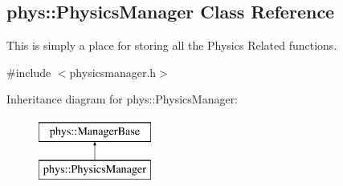 \hypertarget{classphys_1_1PhysicsManager}{
\subsection{phys::PhysicsManager Class Reference}
\label{d3/dcc/classphys_1_1PhysicsManager}
}


This is simply a place for storing all the Physics Related functions.  




{\ttfamily \#include $<$physicsmanager.h$>$}

Inheritance diagram for phys::PhysicsManager:\begin{figure}[H]
\begin{center}
\leavevmode
\includegraphics[height=2.000000cm]{d3/dcc/classphys_1_1PhysicsManager}
\end{center}
\end{figure}

